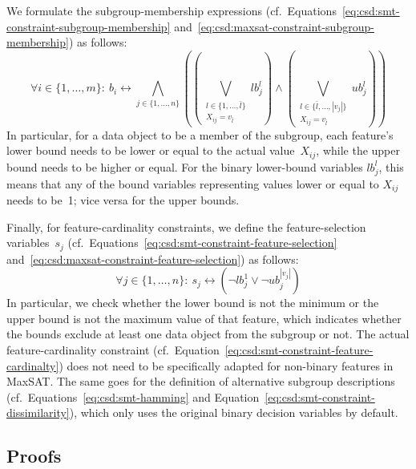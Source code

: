\documentclass{article}
\theoremstyle{definition}
\begin{document}
We formulate the subgroup-membership expressions (cf.~Equations~\ref{eq:csd:smt-constraint-subgroup-membership} and~\ref{eq:csd:maxsat-constraint-subgroup-membership}) as follows:
%
\begin{equation}
	\forall i \in \{1, \dots, m\}:~ b_i\leftrightarrow \bigwedge_{j \in \{1, \dots, n\}} \left( \left( \bigvee_{\substack{l \in \{1, \dots, \bar{l}\} \\ X_{ij} = v_{\bar{l}} }} \mathit{lb}^l_j \right) \land \left( \bigvee_{\substack{l \in \{\bar{l}, \dots, |v_j|\} \\ X_{ij} = v_{\bar{l}} }} \mathit{ub}^l_j \right) \right)
	\label{eq:csd:maxsat-numeric-constraint-subgroup-membership}
\end{equation}
%
In particular, for a data object to be a member of the subgroup, each feature's lower bound needs to be lower or equal to the actual value~$X_{ij}$, while the upper bound needs to be higher or equal.
For the binary lower-bound variables $\mathit{lb}^l_j$, this means that any of the bound variables representing values lower or equal to $X_{ij}$ needs to be~1; vice versa for the upper bounds.

Finally, for feature-cardinality constraints, we define the feature-selection variables~$s_j$ (cf.~Equations~\ref{eq:csd:smt-constraint-feature-selection} and~\ref{eq:csd:maxsat-constraint-feature-selection}) as follows:
%
\begin{equation}
	\forall j \in \{1, \dots, n\}:~ s_j \leftrightarrow \left( \lnot \mathit{lb}^1_j \lor \lnot \mathit{ub}^{|v_j|}_j \right)
	\label{eq:csd:maxsat-numeric-constraint-feature-selection}
\end{equation}
%
In particular, we check whether the lower bound is not the minimum or the upper bound is not the maximum value of that feature, which indicates whether the bounds exclude at least one data object from the subgroup or not.
The actual feature-cardinality constraint (cf.~Equation~\ref{eq:csd:smt-constraint-feature-cardinalty}) does not need to be specifically adapted for non-binary features in MaxSAT.
The same goes for the definition of alternative subgroup descriptions (cf.~Equations~\ref{eq:csd:smt-hamming} and Equation~\ref{eq:csd:smt-constraint-dissimilarity}), which only uses the original binary decision variables by default.

\subsection{Proofs}
\label{sec:csd:appendix:proofs}
\end{document}
